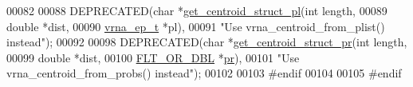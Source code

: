 \begin{DoxyCode}
00082 
00088 DEPRECATED(\textcolor{keywordtype}{char}  *\hyperlink{centroid_8h_a7dcc64bcefcf682396dd3bbea02416fe}{get\_centroid\_struct\_pl}(\textcolor{keywordtype}{int} length,
00089                               \textcolor{keywordtype}{double} *dist,
00090                               \hyperlink{group__struct__utils_structvrna__elem__prob__s}{vrna\_ep\_t} *pl),
00091           \textcolor{stringliteral}{"Use vrna\_centroid\_from\_plist() instead"});
00092 
00098 DEPRECATED(\textcolor{keywordtype}{char}  *\hyperlink{centroid_8h_ac92486ce514677256f4a832dc518759c}{get\_centroid\_struct\_pr}(\textcolor{keywordtype}{int} length,
00099                               \textcolor{keywordtype}{double} *dist,
00100                               \hyperlink{group__data__structures_ga31125aeace516926bf7f251f759b6126}{FLT\_OR\_DBL} *\hyperlink{fold__vars_8h_ac98ec419070aee6831b44e5c700f090f}{pr}),
00101           \textcolor{stringliteral}{"Use vrna\_centroid\_from\_probs() instead"});
00102 
00103 \textcolor{preprocessor}{#endif}
00104 
00105 \textcolor{preprocessor}{#endif}
\end{DoxyCode}
